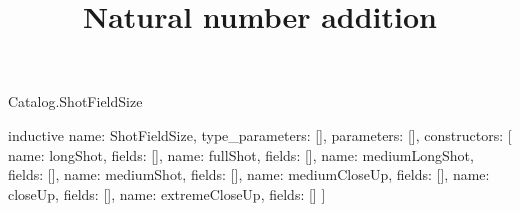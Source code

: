 \begin{lexlean}{Catalog.ShotFieldSize}
\title{Natural number addition}
\begin{semanticmodule}
inductive{
  name: ShotFieldSize,
  type_parameters: [],
  parameters: [],
  constructors: [
    {name: longShot, fields: []},
    {name: fullShot, fields: []},
    {name: mediumLongShot, fields: []},
    {name: mediumShot, fields: []},
    {name: mediumCloseUp, fields: []},
    {name: closeUp, fields: []},
    {name: extremeCloseUp, fields: []}
  ]
}
\end{semanticmodule}
\end{lexlean}
